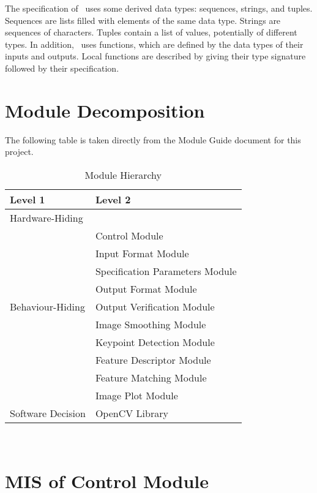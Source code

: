 \documentclass[12pt, titlepage]{article}
\begin{document}
\noindent
The specification of \progname \ uses some derived data types: sequences, strings, and
tuples. Sequences are lists filled with elements of the same data type. Strings
are sequences of characters. Tuples contain a list of values, potentially of
different types. In addition, \progname \ uses functions, which
are defined by the data types of their inputs and outputs. Local functions are
described by giving their type signature followed by their specification.

\section{Module Decomposition}

The following table is taken directly from the Module Guide document for this project.

\begin{table}[h!]
\centering
\begin{tabular}{p{} p{}}
\toprule
\textbf{Level 1} & \textbf{Level 2}\\
\midrule

{Hardware-Hiding} & ~ \\
\midrule

\multirow{9}{0.3\textwidth}{Behaviour-Hiding} & Control Module\\
& Input Format Module \\
& Specification Parameters Module \\
& Output Format Module \\
& Output Verification Module \\
& Image Smoothing Module \\
& Keypoint Detection Module \\
& Feature Descriptor Module \\
& Feature Matching Module \\
& Image Plot Module \\
\midrule

\multirow{5}{0.3\textwidth}{Software Decision} & OpenCV Library \\
\bottomrule
 
\end{tabular}
\caption{Module Hierarchy}
\label{TblMH}
\end{table}

\newpage
~\newpage
\section{MIS of Control Module} \label{mC}
\end{document}
